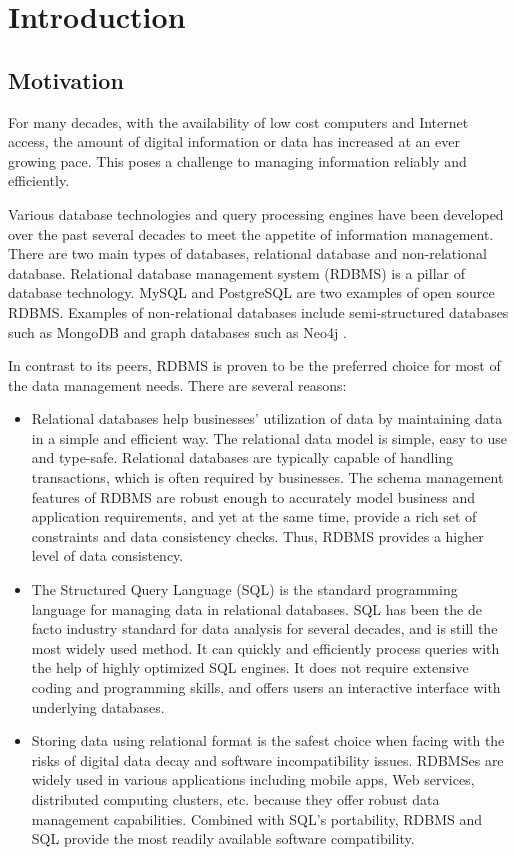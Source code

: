 \chapter{Introduction}

\section{Motivation}

For many decades, with the availability of low cost computers and Internet access, the amount of digital information or data has increased at an ever growing pace. This poses a challenge to managing information reliably and efficiently. 

Various database technologies and query processing engines have been developed over the past several decades to meet the appetite of information management. There are two main types of databases, relational database and non-relational database. Relational database management system (RDBMS)  is a pillar of database technology. MySQL and PostgreSQL are two examples of open source RDBMS. Examples of non-relational databases include semi-structured databases such as MongoDB \cite{mongodb} and graph databases such as Neo4j \cite{neo4j}. 

In contrast to its peers, RDBMS is proven to be the preferred choice for most of the data management needs.  There are several reasons:

\begin{itemize}
 \item Relational databases help businesses' utilization of data by maintaining data in a simple and efficient way. 
 The relational data model is simple, easy to use and type-safe.
 Relational databases are typically capable of handling transactions, which is often required by businesses.
 The schema management features of RDBMS are robust enough to accurately model business and application requirements, and yet at the same time, provide a rich set of constraints and data consistency checks.  Thus, RDBMS provides a higher level of data consistency.

 \item The Structured Query Language (SQL) is the standard programming language for managing data in relational databases. SQL has been the de facto industry standard for data analysis for several decades, and is still the most widely used method. It can quickly and efficiently process queries with the help of highly optimized SQL engines. It does not require extensive coding and programming skills, and offers users an interactive interface with underlying databases.

 \item Storing data using relational format is the safest choice when facing with the risks of digital data decay and software incompatibility issues.
 RDBMSes are widely used in various applications including mobile apps, Web services, distributed computing clusters, etc. because they offer robust data management capabilities. Combined with SQL's portability, 
 RDBMS and SQL provide the most readily available software compatibility.
\end{itemize}

